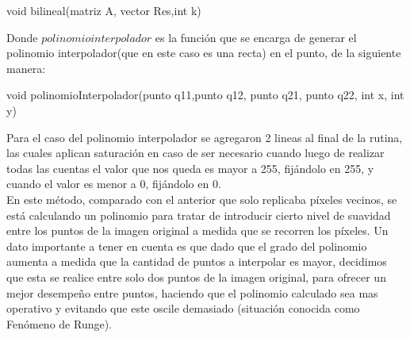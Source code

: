 \begin{algorithm}
\begin{algorithmic}[H]\parskip=1mm
\caption{void bilineal(matriz A, vector Res,int k)}
\end{algorithmic}
\end{algorithm}
Donde $polinomio interpolador$ es la función que se encarga de generar el polinomio interpolador(que en este caso es una recta) en el punto, de la siguiente manera:
\begin{algorithm}
\begin{algorithmic}[H]\parskip=1mm
\caption{void polinomioInterpolador(punto q11,punto q12, punto q21, punto q22, int x, int y)}
\end{algorithmic}
\end{algorithm}
Para el caso del polinomio interpolador se agregaron 2 lineas al final de la rutina, las cuales aplican saturación en caso de ser necesario cuando luego de realizar todas las cuentas el valor que nos queda es mayor a 255, fijándolo en 255, y cuando el valor es menor a 0, fijándolo en 0.
\\
En este método, comparado con el anterior que solo replicaba píxeles vecinos, se está calculando un polinomio para tratar de introducir cierto nivel de suavidad entre los puntos de la imagen original a medida que se recorren los píxeles. Un dato importante a tener en cuenta es que dado que el grado del polinomio aumenta a medida que la cantidad de puntos a interpolar es mayor, decidimos que esta se realice entre solo dos puntos de la imagen original, para ofrecer un mejor desempe\~no entre puntos, haciendo que el polinomio calculado sea mas operativo y evitando que este oscile demasiado (situación conocida como Fenómeno de Runge). 
